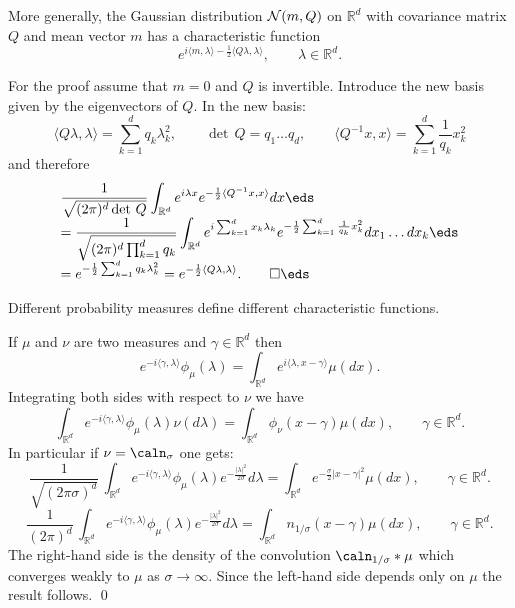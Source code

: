 \documentclass[preprint]{imsart}
\def\R{\mathbb R}
\def\ds{\displaystyle}
\begin{document}
{\begin{Example}
\begin{em}
More generally, the Gaussian distribution
${\cal N}(m,Q)$  on $\R^{d}$ with
 covariance
matrix $Q$  and mean vector $m$  has a characteristic function
$$
e^{i\langle m,\lambda\rangle
-\frac{1}{2}\langle Q\lambda,\lambda\rangle},
\qquad \lambda\in\R^d.
$$


For the proof assume that $m=0$ and $Q$ is invertible.
Introduce the new basis given by
the eigenvectors of $Q$. In the
new basis:
$$
\langle Q\lambda,\lambda\rangle =
\sum_{k=1}^d  q_k\lambda_k^2,\qquad
\det \, Q=q_1\ldots q_d,\qquad
\langle Q^{-1}x,x\rangle =
\sum_{k=1}^d  \frac{1}{q_k}x_k^2
$$
and therefore
$$\begin{array}{l}\ds
\frac{1}{\sqrt{(2\pi)^d\det \, Q}}
\int_{\R^d}
e^{i\lambda x}
e^{-\frac{1}{2}\langle Q^{-1}x,x\rangle}
dx
\eds\\\ds
=
\frac{1}{\sqrt{(2\pi)^d\prod_{k=1}^dq_k}}
\int_{\R^d}
e^{i\sum_{k=1}^dx_k\lambda_k}
e^{-\frac{1}{2}\sum_{k=1}^d\frac{1}{q_k}x_k^2}
dx_1\ldots dx_k
\eds\\\ds
=
e^{-\frac{1}{2}\sum_{k=1}^dq_k\lambda_k^2}
=e^{-\frac{1}{2}\langle Q\lambda,\lambda\rangle }. \qed
\eds\end{array}
$$








\end{em}
\end{Example}



\begin{Proposition}
Different probability measures define different
characteristic functions.
\end{Proposition}

If $\mu$ and $\nu$ are two measures and $\gamma\in\R^d$
then
$$
e^{-i\langle \gamma,\lambda\rangle} \phi_\mu(\lambda)=
\int_{\R^d}e^{i\langle \lambda, x-\gamma\rangle}
\mu(dx).
$$
Integrating both sides with respect to $\nu$ we have
$$
\int_{\R^d}e^{-i\langle \gamma, \lambda\rangle}
\phi_\mu(\lambda)\nu(d\lambda)=
\int_{\R^d}\phi_\nu( x-\gamma)
\mu(dx),\qquad \gamma\in\R^d.
$$
In particular if $\nu=\caln_\sigma$ one gets:
$$
\frac{1}{\sqrt{(2\pi \sigma)^d}}\,
\int_{\R^d}e^{-i\langle \gamma, \lambda\rangle}
\phi_\mu(\lambda)e^{-\frac{|\lambda|^2} {2\sigma}}
d\lambda =
 \int_{\R^d}e^{-\frac{\sigma}{2}|x-\gamma|^2}
 \mu(dx),\qquad \gamma\in\R^d.
$$
$$
\frac{1}{ (2\pi  )^d}\,
\int_{\R^d}e^{-i\langle \gamma, \lambda\rangle}
\phi_\mu(\lambda)e^{-\frac{|\lambda|^2} {2\sigma}}
d\lambda =
 \int_{\R^d}n_{1/\sigma}(x-\gamma)
 \mu(dx),\qquad \gamma\in\R^d.
$$
The right-hand side is the density of the convolution
$\caln_{1/\sigma}*\mu$ which converges weakly to $\mu$
as $\sigma \to \infty$. Since the left-hand side
depends only on $\mu$ the result follows. \qed

}
\end{document}
